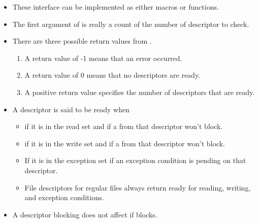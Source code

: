 \documentclass[]{article}
\begin{document}
\begin{itemize}
\item These interface can be implemented as either macros or functions.
\item The first argument of  is really a count of the number of
descriptor to check.
\item There are three possible return values from .
\begin{enumerate}
\item A return value of -1 means that an error occurred.
\item A return value of 0 means that no descriptors are ready.
\item A positive return value specifies the number of descriptors that are
ready.
\end{enumerate}
\item A descriptor is said to be ready when
\begin{itemize}
\item if it is in the read set and if a  from that descriptor won't
block.
\item if it is in the write set and if a  from that descriptor won't
block.
\item If it is in the exception set if an exception condition is pending on that
descriptor.
\item File descriptors for regular files always return ready for reading,
writing, and exception conditions.
\end{itemize}
\item A descriptor blocking does not affect if  blocks.
\end{itemize}
\end{document}
